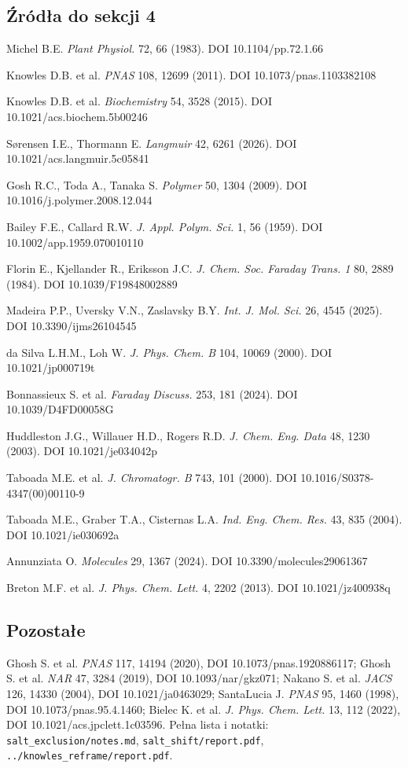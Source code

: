 \documentclass[11pt,a4paper]{article}
\begin{document}
\subsection*{Źródła do sekcji 4}
\footnotesize
\begin{enumerate}[label={[\arabic*]},leftmargin=*,itemsep=0pt]
\item Michel B.E. \emph{Plant Physiol.} 72, 66 (1983). DOI 10.1104/pp.72.1.66
\item Knowles D.B. et al. \emph{PNAS} 108, 12699 (2011). DOI 10.1073/pnas.1103382108
\item Knowles D.B. et al. \emph{Biochemistry} 54, 3528 (2015). DOI 10.1021/acs.biochem.5b00246
\item Sørensen I.E., Thormann E. \emph{Langmuir} 42, 6261 (2026). DOI 10.1021/acs.langmuir.5c05841
\item Gosh R.C., Toda A., Tanaka S. \emph{Polymer} 50, 1304 (2009). DOI 10.1016/j.polymer.2008.12.044
\item Bailey F.E., Callard R.W. \emph{J. Appl. Polym. Sci.} 1, 56 (1959). DOI 10.1002/app.1959.070010110
\item Florin E., Kjellander R., Eriksson J.C. \emph{J. Chem. Soc. Faraday Trans. 1} 80, 2889 (1984). DOI 10.1039/F19848002889
\item Madeira P.P., Uversky V.N., Zaslavsky B.Y. \emph{Int. J. Mol. Sci.} 26, 4545 (2025). DOI 10.3390/ijms26104545
\item da Silva L.H.M., Loh W. \emph{J. Phys. Chem. B} 104, 10069 (2000). DOI 10.1021/jp000719t
\item Bonnassieux S. et al. \emph{Faraday Discuss.} 253, 181 (2024). DOI 10.1039/D4FD00058G
\item Huddleston J.G., Willauer H.D., Rogers R.D. \emph{J. Chem. Eng. Data} 48, 1230 (2003). DOI 10.1021/je034042p
\item Taboada M.E. et al. \emph{J. Chromatogr. B} 743, 101 (2000). DOI 10.1016/S0378-4347(00)00110-9
\item Taboada M.E., Graber T.A., Cisternas L.A. \emph{Ind. Eng. Chem. Res.} 43, 835 (2004). DOI 10.1021/ie030692a
\item Annunziata O. \emph{Molecules} 29, 1367 (2024). DOI 10.3390/molecules29061367
\setcounter{enumi}{19}
\item Breton M.F. et al. \emph{J. Phys. Chem. Lett.} 4, 2202 (2013). DOI 10.1021/jz400938q
\end{enumerate}
\subsection*{Pozostałe}
Ghosh S. et al. \emph{PNAS} 117, 14194 (2020), DOI 10.1073/pnas.1920886117; Ghosh S. et al. \emph{NAR} 47, 3284 (2019), DOI 10.1093/nar/gkz071; Nakano S. et al. \emph{JACS} 126, 14330 (2004), DOI 10.1021/ja0463029; SantaLucia J. \emph{PNAS} 95, 1460 (1998), DOI 10.1073/pnas.95.4.1460; Bielec K. et al. \emph{J. Phys. Chem. Lett.} 13, 112 (2022), DOI 10.1021/acs.jpclett.1c03596. Pełna lista i notatki: \texttt{salt\_exclusion/notes.md}, \texttt{salt\_shift/report.pdf}, \texttt{../knowles\_reframe/report.pdf}.
\normalsize
\end{document}
